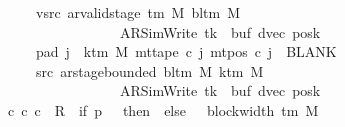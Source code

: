 \begin{isabellebody}
\ \ \ \ \ \ \ vsrc{\isacharcolon}{\kern0pt}\ {\isachardoublequoteopen}ar{\isacharunderscore}{\kern0pt}valid{\isacharunderscore}{\kern0pt}stage\ {\isacharparenleft}{\kern0pt}{\isasymGamma}{\isacharunderscore}{\kern0pt}tm\ M{\isacharparenright}{\kern0pt}\ {\isacharparenleft}{\kern0pt}bl{\isacharunderscore}{\kern0pt}tm\ M{\isacharparenright}{\kern0pt}\isanewline
\ \ \ \ \ \ \ \ \ \ \ \ \ \ \ \ \ \ \ {\isacharparenleft}{\kern0pt}AR{\isacharunderscore}{\kern0pt}SimWrite{\isacharcomma}{\kern0pt}\ tk{\isacharcomma}{\kern0pt}\ {}{\isacharcomma}{\kern0pt}\ buf{\isacharcomma}{\kern0pt}\ dvec{\isacharcomma}{\kern0pt}\ posk{\isacharparenright}{\kern0pt}{\isachardoublequoteclose}\isanewline
\ \ \ \ \ \ \ pad{}{\isacharcolon}{\kern0pt}\ {\isachardoublequoteopen}{\isasymforall}j\ {\isasymge}\ k{\isacharunderscore}{\kern0pt}tm\ M{\isachardot}{\kern0pt}\ mt{\isacharunderscore}{\kern0pt}tape\ c{\isacharprime}{\kern0pt}\ j\ {\isacharparenleft}{\kern0pt}mt{\isacharunderscore}{\kern0pt}pos\ c{\isacharprime}{\kern0pt}\ j{\isacharparenright}{\kern0pt}\ {\isacharequal}{\kern0pt}\ BLANK{}{\isachardoublequoteclose}\isanewline
\ \ \ \ \ \ \ src{}{\isacharcolon}{\kern0pt}\ {\isachardoublequoteopen}ar{\isacharunderscore}{\kern0pt}stage{\isacharunderscore}{\kern0pt}bounded\ {\isacharparenleft}{\kern0pt}bl{\isacharunderscore}{\kern0pt}tm\ M{\isacharparenright}{\kern0pt}\ {\isacharparenleft}{\kern0pt}k{\isacharunderscore}{\kern0pt}tm\ M{\isacharparenright}{\kern0pt}\isanewline
\ \ \ \ \ \ \ \ \ \ \ \ \ \ \ \ \ \ \ {\isacharparenleft}{\kern0pt}AR{\isacharunderscore}{\kern0pt}SimWrite{\isacharcomma}{\kern0pt}\ tk{\isacharcomma}{\kern0pt}\ {}{\isacharcomma}{\kern0pt}\ buf{\isacharcomma}{\kern0pt}\ dvec{\isacharcomma}{\kern0pt}\ posk{\isacharparenright}{\kern0pt}{\isachardoublequoteclose}\isanewline
\ \ \ {\isachardoublequoteopen}{\isasymexists}c{\isacharprime}{\kern0pt}{\isacharprime}{\kern0pt}{\isachardot}{\kern0pt}\ {\isacharparenleft}{\kern0pt}c{\isacharprime}{\kern0pt}{\isacharcomma}{\kern0pt}\ c{\isacharprime}{\kern0pt}{\isacharprime}{\kern0pt}{\isacharparenright}{\kern0pt}\ {\isasymin}\ R{\isacharprime}{\kern0pt}\ {\isacharcircum}{\kern0pt}{\isacharcircum}{\kern0pt}\ {\isacharparenleft}{\kern0pt}if\ p\ {\isacharequal}{\kern0pt}\ {}\ then\ {}\ else\ {}\ {\isacharasterisk}{\kern0pt}\ block{\isacharunderscore}{\kern0pt}width\ {\isacharparenleft}{\kern0pt}{\isasymGamma}{\isacharunderscore}{\kern0pt}tm\ M{\isacharparenright}{\kern0pt}{\isacharparenright}{\kern0pt}\isanewline

\end{isabellebody}
